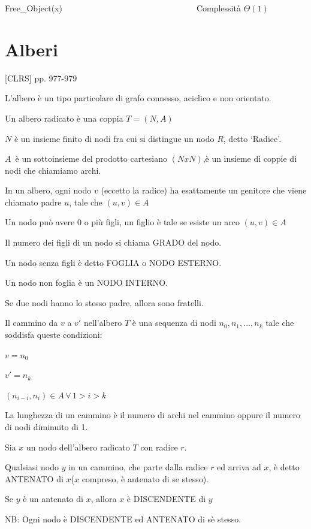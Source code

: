 \documentclass[11pt,a4paper,twoside,openright]{book}
\begin{document}
{{{Free\_Object(x)}{~~~~~~~~~~~~~~~~~~~~~~~~~~~~~~~~Complessità $\Theta(1)$}



\section{Alberi}

{{[}CLRS{]} pp. 977-979}

{L'albero è un tipo particolare di grafo connesso, aciclico e non orientato.}

{Un albero radicato è una coppia $T=(N,A)$}

{$N$ è un insieme finito di nodi fra cui si distingue un nodo $R$, detto `Radice'.}

$A${~è un sottoinsieme del prodotto cartesiano $(NxN)$,è un insieme di coppie di nodi che chiamiamo archi.}

{In un albero, ogni nodo $v$ (eccetto la radice) ha esattamente un genitore che viene chiamato padre $u$, tale che $(u,v) \in A$}



{Un nodo può avere $0$ o più figli, un figlio è tale se esiste un arco $(u,v) \in A$}

{Il numero dei figli di un nodo si chiama GRADO del nodo.}

{Un nodo senza figli è detto FOGLIA o NODO ESTERNO.}

{Un nodo non foglia è un NODO INTERNO.}

{Se due nodi hanno lo stesso padre, allora sono fratelli.}

{Il cammino da $v$ a $v'$ nell'albero $T$ è una sequenza di nodi $n_0,n_1,\ldots,n_k$ tale che soddisfa queste condizioni:}

$v=n_0$

$v'=n_k$

$(n_{i-i},n_i) \in A\,\forall\,1>i>k$

{La lunghezza di un cammino è il numero di archi nel cammino oppure il numero di nodi diminuito di 1.}

{Sia $x$ un nodo dell'albero radicato $T$ con radice $r$.}

{Qualsiasi nodo $y$ in un cammino, che parte dalla radice $r$ ed arriva ad $x$, è detto ANTENATO di $x$($x$ compreso, è antenato di se stesso).}

{Se $y$ è un antenato di $x$, allora $x$ è DISCENDENTE di $y$}

{NB: Ogni nodo è DISCENDENTE ed ANTENATO di sè stesso.}

}}
\end{document}
